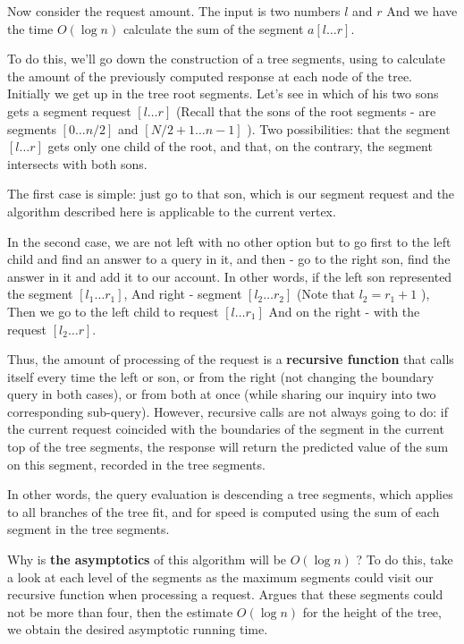 Now consider the request amount. The input is two numbers $l$ and $r$ And we have the time $O (\log n)$ calculate the sum of the segment $a [l \ldots r]$.

To do this, we'll go down the construction of a tree segments, using to calculate the amount of the previously computed response at each node of the tree. Initially we get up in the tree root segments. Let's see in which of his two sons gets a segment request $[l \ldots r]$ (Recall that the sons of the root segments - are segments $[0 \ldots n / 2]$ and $[N / 2 +1 \ldots n-1]$ ). Two possibilities: that the segment $[l \ldots r]$ gets only one child of the root, and that, on the contrary, the segment intersects with both sons.

The first case is simple: just go to that son, which is our segment request and the algorithm described here is applicable to the current vertex.

In the second case, we are not left with no other option but to go first to the left child and find an answer to a query in it, and then - go to the right son, find the answer in it and add it to our account. In other words, if the left son represented the segment $[l_1 \ldots r_1]$, And right - segment $[l_2 \ldots r_2]$ (Note that $l_2 = r_1 + 1$ ), Then we go to the left child to request $[l \ldots r_1]$ And on the right - with the request $[l_2 \ldots r]$.

Thus, the amount of processing of the request is a \textbf{recursive function} that calls itself every time the left or son, or from the right (not changing the boundary query in both cases), or from both at once (while sharing our inquiry into two corresponding sub-query). However, recursive calls are not always going to do: if the current request coincided with the boundaries of the segment in the current top of the tree segments, the response will return the predicted value of the sum on this segment, recorded in the tree segments.

In other words, the query evaluation is descending a tree segments, which applies to all branches of the tree fit, and for speed is computed using the sum of each segment in the tree segments.

Why is \textbf{the asymptotics} of this algorithm will be $O (\log n)$ ? To do this, take a look at each level of the segments as the maximum segments could visit our recursive function when processing a request. Argues that these segments could not be more than four, then the estimate $O (\log n)$ for the height of the tree, we obtain the desired asymptotic running time.

